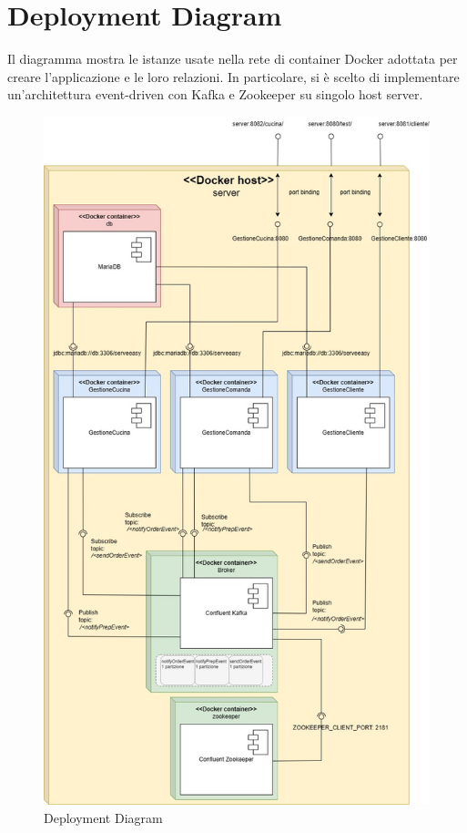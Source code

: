 \section{Deployment Diagram}
Il diagramma mostra le istanze usate nella rete di container Docker adottata per creare l'applicazione e le loro relazioni. In particolare, si è scelto di implementare un'architettura event-driven con Kafka e Zookeeper su singolo host server.

\begin{figure}[htbp]
	\centering
	\includegraphics[scale=0.35]{iterazione1/images/deployment_iterazione1.jpg}
	\caption{Deployment Diagram
 \label{fig:deploymentdiagram}}
\end{figure}
\clearpage